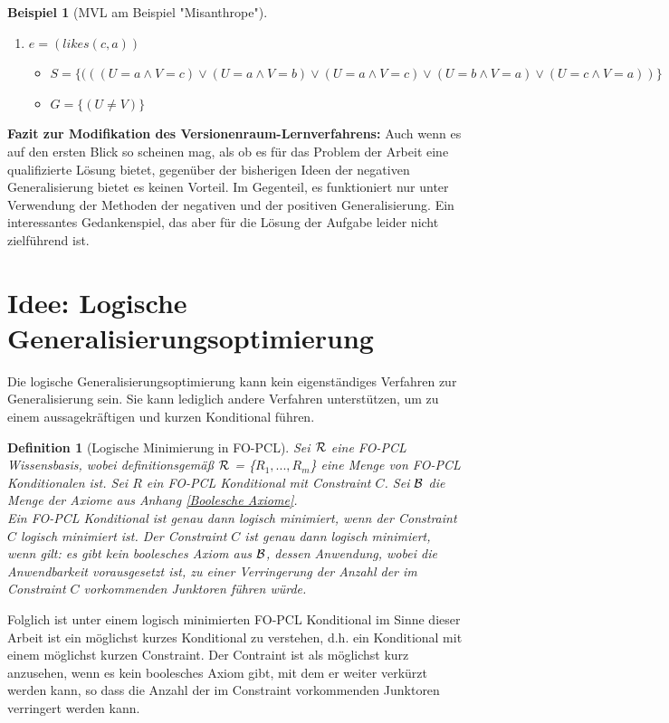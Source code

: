 \documentclass[draft]{scrreprt}
\newtheorem{Def}{Definition }[section]
\newtheorem{Bsp}{Beispiel}[section]
\begin{document}
\begin{Bsp}[MVL am Beispiel "{}Misanthrope"{}]
\begin{itemize}
\begin{enumerate}
\begin{itemize}
			\item $ G = \{(U \neq V)\} $
		\end{itemize}
		\item $ e = (likes(c,a)) $
		\begin{itemize}
			\item $ S = \{(((U = a \land V = c) \lor (U = a \land V = b) \lor (U = a \land V = c) \lor (U = b \land V = a) \lor (U = c \land V = a))\}$ 
			\item $ G = \{(U \neq V)\} $
		\end{itemize}	
	\end{enumerate}
\end{itemize}
\end{Bsp}
\textbf{{\large Fazit zur Modifikation des Versionenraum-Lernverfahrens:}} \label{Fazit VRL} 
Auch wenn es auf den ersten Blick so scheinen mag, als ob es für das Problem der Arbeit eine qualifizierte Lösung bietet, gegenüber der bisherigen Ideen der negativen Generalisierung bietet es keinen Vorteil. Im Gegenteil, es funktioniert nur unter Verwendung der Methoden der negativen und der positiven Generalisierung. Ein interessantes Gedankenspiel, das aber für die Lösung der Aufgabe leider nicht zielführend ist. 



\section{Idee: Logische Generalisierungsoptimierung} 


	Die logische Generalisierungsoptimierung kann kein eigenständiges Verfahren zur Generalisierung sein. Sie kann lediglich andere Verfahren unterstützen, um zu einem aussagekräftigen und kurzen Konditional führen.
\begin{Def}[Logische Minimierung in FO-PCL] \label{Logische Min} 
	Sei $\cal{R}$ eine FO-PCL Wissensbasis, wobei definitionsgemäß $\cal{R}$  = \{$ R_1, ..., R_m $\} eine Menge von FO-PCL Konditionalen ist. Sei $ R $ ein FO-PCL Konditional mit Constraint $ C $. Sei $ \cal B $ die Menge der Axiome aus Anhang \ref{Boolesche Axiome}.\\
	Ein FO-PCL Konditional ist genau dann logisch minimiert, wenn der Constraint $ C $ logisch minimiert ist. Der Constraint $ C $ ist genau dann logisch minimiert, wenn gilt: es gibt kein boolesches Axiom aus $\cal B  $, dessen Anwendung, wobei die Anwendbarkeit vorausgesetzt ist, zu einer Verringerung der Anzahl der im Constraint $ C $ vorkommenden Junktoren führen würde.
\end{Def}
Folglich ist unter einem logisch minimierten FO-PCL Konditional im Sinne dieser Arbeit ist ein möglichst kurzes Konditional zu verstehen, d.h. ein Konditional mit einem möglichst kurzen Constraint. Der Contraint ist als möglichst kurz anzusehen, wenn es kein boolesches Axiom gibt, mit dem er weiter verkürzt werden kann, so dass die Anzahl der im Constraint vorkommenden Junktoren verringert werden kann. 
\end{document}
